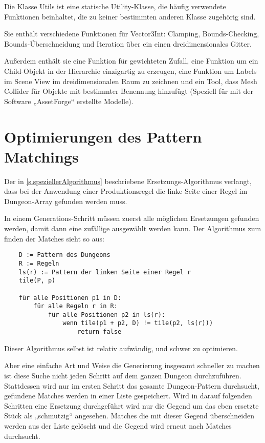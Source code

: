 Die Klasse Utils ist eine statische Utility-Klasse, die häufig verwendete Funktionen beinhaltet, die zu keiner bestimmten anderen Klasse zugehörig sind.

Sie enthält verschiedene Funktionen für Vector3Int\cite[Seite: Vector3Int]{unitySciptingReference}: Clamping, Bounds-Checking, Bounds-Überschneidung und Iteration über ein einen dreidimensionales Gitter.

Außerdem enthält sie eine Funktion für gewichteten Zufall, eine Funktion um ein Child-Objekt in der Hierarchie einzigartig zu erzeugen, eine Funktion um Labels im Scene View im dreidimensionalen Raum zu zeichnen und ein Tool, dass Mesh Collider für Objekte mit bestimmter Benennung hinzufügt (Speziell für mit der Software „AssetForge“ erstellte Modelle).

\section{Optimierungen des Pattern Matchings}\label{s.optimierungen}

Der in \ref{s.speziellerAlgorithmus} beschriebene Ersetzungs-Algorithmus verlangt, dass bei der Anwendung einer Produktionsregel die linke Seite einer Regel im Dungeon-Array gefunden werden muss.

In einem Generations-Schritt müssen zuerst alle möglichen Ersetzungen gefunden werden, damit dann eine zufällige ausgewählt werden kann. Der Algorithmus zum finden der Matches sieht so aus:

\begin{verbatim}
    D := Pattern des Dungeons
    R := Regeln
    ls(r) := Pattern der linken Seite einer Regel r
    tile(P, p)

    für alle Positionen p1 in D:
        für alle Regeln r in R:
            für alle Positionen p2 in ls(r):
                wenn tile(p1 + p2, D) != tile(p2, ls(r)))
                    return false
\end{verbatim}


Dieser Algorithmus selbst ist relativ aufwändig, und schwer zu optimieren. 

Aber eine einfache Art und Weise die Generierung insgesamt schneller zu machen ist diese Suche nicht jeden Schritt auf dem ganzen Dungeon durchzuführen. Stattdessen wird nur im ersten Schritt das gesamte Dungeon-Pattern durchsucht, gefundene Matches werden in einer Liste gespeichert. Wird in darauf folgenden Schritten eine Ersetzung durchgeführt wird nur die Gegend um das eben ersetzte Stück als „schmutzig“ angesehen. Matches die mit dieser Gegend überschneiden werden aus der Liste gelöscht und die Gegend wird erneut nach Matches durchsucht. 

